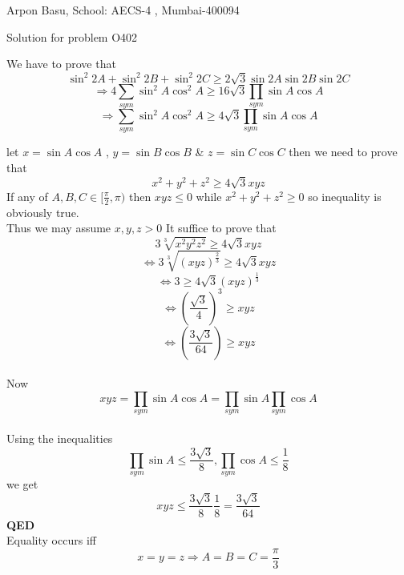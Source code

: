 \documentclass[10pt,a4paper]{extarticle}
\begin{document}
\begin{center}


Arpon Basu, School: AECS-4 , Mumbai-400094

Solution for problem O402
\end{center}
We have to prove that 
$$\sin^{2}2A+\sin^{2}2B+\sin^{2}2C \ge 2\sqrt{3} \sin 2A \sin 2B \sin 2C$$
$$\Rightarrow 4 \sum_{sym} \sin^{2}A \cos^{2}A \ge 16\sqrt{3} \prod_{sym} \sin A \cos A $$
$$\Rightarrow  \sum_{sym} \sin^{2}A \cos^{2}A \ge 4\sqrt{3} \prod_{sym} \sin A \cos A $$

let $x=\sin A \cos A $ , $y=\sin B \cos B $ \& $z=\sin C \cos C $ then we need to prove that 
$$ x^{2}+y^{2}+z^{2} \ge 4\sqrt{3}xyz $$
If any of $ A, B ,C \in  [ \frac{\pi}{2} , \pi )  $ then $xyz \le 0 $ while $ x^{2}+y^{2}+z^{2} \ge 0 $ so inequality
is obviously true. \\ 
Thus we may assume $x,y,z > 0 $
It suffice to prove that 
$$ 3\sqrt[3]{x^{2}y^{2}z^{2}} \ge 4\sqrt{3} xyz$$
$$ \Leftrightarrow 3\sqrt[3]{(xyz)^{\frac{2}{3}}} \ge 4\sqrt{3} xyz$$
$$ \Leftrightarrow 3 \ge 4\sqrt{3} {(xyz)^{\frac{1}{3}}}$$
$$ \Leftrightarrow (\frac{\sqrt{3}}{4})^3 \ge xyz$$
$$ \Leftrightarrow (\frac{3\sqrt{3}}{64}) \ge xyz$$ \\
Now 
$$ xyz=\prod_{sym} \sin A \cos A = \prod_{sym} \sin A   \prod_{sym} \cos A$$  \\
Using the inequalities \\

$$\prod_{sym} \sin A \le \frac{3\sqrt{3}}{8} , \prod_{sym} \cos A \le \frac{1}{8} $$ we get \\
$$xyz \leq \frac{3\sqrt{3}}{8} \frac{1}{8} = \frac{3\sqrt{3}}{64}    $$      
  \textbf{QED}  \\
Equality occurs iff $$x=y=z \Rightarrow A=B=C=\frac{\pi}{3}$$
\end{document}
